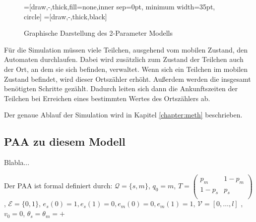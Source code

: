 \begin{figure}[h]
 \centering

\usetikzlibrary{arrows,%
                topaths}%
=[draw,-,thick,fill=none,inner sep=0pt, minimum width=35pt, circle]
=[draw,-,thick,black]
\usetikzlibrary{arrows,decorations.pathmorphing,backgrounds,positioning,fit}


\caption{Graphische Darstellung des 2-Parameter Modells}
\label{tikz:2p_Mod}
\end{figure}

Für die Simulation müssen viele Teilchen, ausgehend vom mobilen Zustand, den Automaten durchlaufen. Dabei wird zusätzlich zum Zustand der Teilchen auch der Ort, an dem sie sich befinden, verwaltet. Wenn sich ein Teilchen im mobilen Zustand befindet, wird dieser Ortszähler erhöht. Außerdem werden die insgesamt benötigten Schritte gezählt. Dadurch leiten sich dann die Ankunftszeiten der Teilchen bei Erreichen eines bestimmten Wertes des Ortszählers ab.

Der genaue Ablauf der Simulation wird in Kapitel \ref{chapter:meth} beschrieben.


\subsection{PAA zu diesem Modell}
Blabla...

Der PAA ist formal definiert durch: $\mathcal{Q} = \{s, m\}$, $q_0 = m$, $T =
 \begin{pmatrix}
  p_{m} & 1-p_{m}  \\
  1-p_{s} & p_{s} \\
 \end{pmatrix}$, $\mathcal{E} = \{0, 1\}$, $e_s(0) = 1, e_s(1)=0, e_m(0) = 0, e_m(1)=1$,
 $\mathcal{V} = [0, \ldots, l]$ , $v_0 = 0$, $\theta_s = \theta_m = + $

